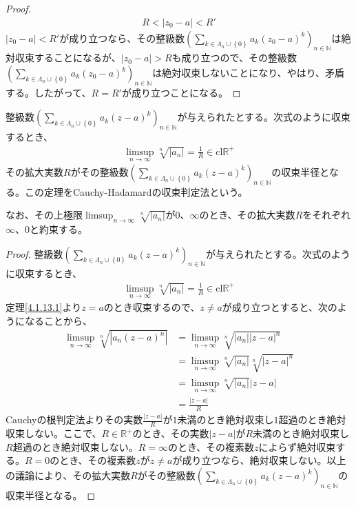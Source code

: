 \documentclass[dvipdfmx]{jsarticle}
\begin{document}
\begin{proof}
\begin{align*}
R < \left| z_{0} - a \right| < R'
\end{align*}
$\left| z_{0} - a \right| < R'$が成り立つなら、その整級数$\left( \sum_{k \in \varLambda_{n} \cup \left\{ 0 \right\}} {a_{k}\left( z_{0} - a \right)^{k}} \right)_{n \in \mathbb{N}}$は絶対収束することになるが、$\left| z_{0} - a \right| > R$も成り立つので、その整級数$\left( \sum_{k \in \varLambda_{n} \cup \left\{ 0 \right\}} {a_{k}\left( z_{0} - a \right)^{k}} \right)_{n \in \mathbb{N}}$は絶対収束しないことになり、やはり、矛盾する。したがって、$R = R'$が成り立つことになる。
\end{proof}
\begin{thm}\label{4.1.13.9}
整級数$\left( \sum_{k \in \varLambda_{n} \cup \left\{ 0 \right\}} {a_{k}(z - a)^{k}} \right)_{n \in \mathbb{N}}$が与えられたとする。次式のように収束するとき、
\begin{align*}
\limsup_{n \rightarrow \infty}\sqrt[n]{\left| a_{n} \right|} = \frac{1}{R} \in \mathrm{cl}\mathbb{R}^{+}
\end{align*}
その拡大実数$R$がその整級数$\left( \sum_{k \in \varLambda_{n} \cup \left\{ 0 \right\}} {a_{k}(z - a)^{k}} \right)_{n \in \mathbb{N}}$の収束半径となる。この定理をCauchy-Hadamardの収束判定法という。
\end{thm}\par
なお、その上極限$\limsup_{n \rightarrow \infty}\sqrt[n]{\left| a_{n} \right|}$が$0$、$\infty$のとき、その拡大実数$R$をそれぞれ$\infty$、$0$と約束する。
\begin{proof}
整級数$\left( \sum_{k \in \varLambda_{n} \cup \left\{ 0 \right\}} {a_{k}(z - a)^{k}} \right)_{n \in \mathbb{N}}$が与えられたとする。次式のように収束するとき、
\begin{align*}
\limsup_{n \rightarrow \infty}\sqrt[n]{\left| a_{n} \right|} = \frac{1}{R} \in \mathrm{cl}\mathbb{R}^{+}
\end{align*}
定理\ref{4.1.13.1}より$z = a$のとき収束するので、$z \neq a$が成り立つとすると、次のようになることから、
\begin{align*}
\limsup_{n \rightarrow \infty}\sqrt[n]{\left| a_{n}(z - a)^{n} \right|} &= \limsup_{n \rightarrow \infty}\sqrt[n]{\left| a_{n} \right||z - a|^{n}}\\
&= \limsup_{n \rightarrow \infty}{\sqrt[n]{\left| a_{n} \right|}\sqrt[n]{|z - a|^{n}}}\\
&= \limsup_{n \rightarrow \infty}\sqrt[n]{\left| a_{n} \right|}|z - a|\\
&= \frac{|z - a|}{R}
\end{align*}
Cauchyの根判定法よりその実数$\frac{|z - a|}{R}$が$1$未満のとき絶対収束し$1$超過のとき絶対収束しない。ここで、$R \in \mathbb{R}^{+}$のとき、その実数$|z - a|$が$R$未満のとき絶対収束し$R$超過のとき絶対収束しない。$R = \infty$のとき、その複素数$z$によらず絶対収束する。$R = 0$のとき、その複素数$z$が$z \neq a$が成り立つなら、絶対収束しない。以上の議論により、その拡大実数$R$がその整級数$\left( \sum_{k \in \varLambda_{n} \cup \left\{ 0 \right\}} {a_{k}(z - a)^{k}} \right)_{n \in \mathbb{N}}$の収束半径となる。
\end{proof}
\end{document}
